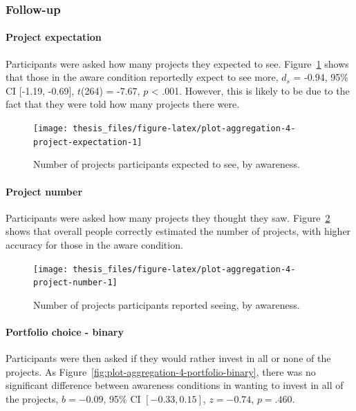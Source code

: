 \documentclass[a4paper, nobind, dvipsnames]{templates/ociamthesis}
\theoremstyle{definition}
\theoremstyle{definition}
\theoremstyle{definition}
\theoremstyle{definition}
\theoremstyle{remark}
\begin{document}
\subsubsection{Follow-up}

\paragraph{Project expectation}

Participants were asked how many projects they expected to see.
Figure~\ref{fig:plot-aggregation-4-project-expectation} shows that those in the
aware condition reportedly expect to see more,
\(d_s\) = -0.94, 95\% CI {[}-1.19, -0.69{]}, \(t\)(264) = -7.67, \(p\) \textless{} .001. However, this is likely to be due to
the fact that they were told how many projects there were.



\begin{figure}
\texttt{[image: thesis\_files/figure-latex/plot-aggregation-4-project-expectation-1]} \caption{Number of projects participants expected to see, by awareness.}\label{fig:plot-aggregation-4-project-expectation}
\end{figure}

\paragraph{Project number}

Participants were asked how many projects they thought they saw.
Figure~\ref{fig:plot-aggregation-4-project-number} shows that overall people
correctly estimated the number of projects, with higher accuracy for those in the
aware condition.



\begin{figure}
\texttt{[image: thesis\_files/figure-latex/plot-aggregation-4-project-number-1]} \caption{Number of projects participants reported seeing, by awareness.}\label{fig:plot-aggregation-4-project-number}
\end{figure}

\paragraph{Portfolio choice - binary}

Participants were then asked if they would rather invest in all or none of the
projects. As Figure~\ref{fig:plot-aggregation-4-portfolio-binary}, there was no
significant difference between awareness conditions in wanting to invest
in all of the projects,
\(b = -0.09\), 95\% CI \([-0.33, 0.15]\), \(z = -0.74\), \(p = .460\).
\end{document}

